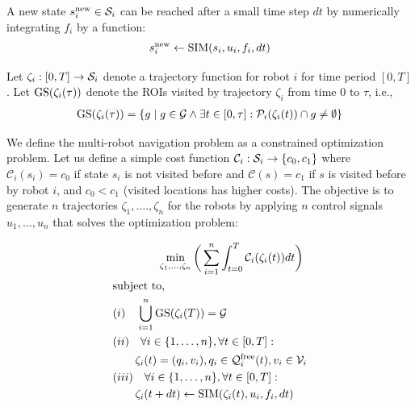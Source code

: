 \documentclass{article}
\begin{document}
A new state $s_i^{\operatorname{new}} \in \mathcal{S}_i$ can be reached after a small time step $dt$ by numerically integrating $f_i$ by a function:
\begin{equation}
    s_i^{\operatorname{new}} \gets \operatorname{SIM}(s_i, u_i, f_i, dt)
\end{equation}

Let $\zeta_i: [0,T] \to \mathcal{S}_i$ denote a trajectory function for robot $i$ for time period $[0,T]$. Let $\operatorname{GS}(\zeta_i(\tau))$ denote the ROIs visited by trajectory $\zeta_i$ from time $0$ to $\tau$, i.e.,
\begin{equation}
\begin{split}
\operatorname{GS}(\zeta_i(\tau)) = \{ g \mid g \in \mathcal{G} \land \exists t \in [0,\tau]: \mathcal{P}_i(\zeta_i(t)) \cap g \neq \emptyset \}
\end{split}
\end{equation}

We define the multi-robot navigation problem as a constrained optimization problem. Let us define a simple cost function $\mathcal{C}_i: \mathcal{S}_i \to \{ c_0, c_1 \}$ where $\mathcal{C}_i(s_i) = c_0$ if state $s_i$ is not visited before and $\mathcal{C}(s) = c_1$ if $s$ is visited before by robot $i$, and $c_0 < c_1$ (visited locations has higher costs). The objective is to generate $n$ trajectories $\zeta_1,\ldots.,\zeta_n$ for the robots by applying $n$ control signals $u_1,\ldots,u_n$ that solves the optimization problem:

\begin{align}
& \qquad \qquad \min_{\zeta_1, \ldots, \zeta_n} \bigg( \sum_{i=1}^{n} \int_{t=0}^{T} \mathcal{C}_i (\zeta_i(t))dt \bigg)   \label{eq:opt} \\
& \textrm{subject to, }    \nonumber \\
& (i) \quad \bigcup_{i=1}^n \operatorname{GS}(\zeta_i(T)) = \mathcal{G}  \label{eq:const1}\\
& (ii) \quad \forall i \in \{1,\ldots,n\}, \forall t \in [0,T]: \nonumber \\
& \qquad \zeta_i(t) = (q_i, v_i), q_i \in \mathcal{Q}_i^{\mathrm{free}}(t), v_i \in \mathcal{V}_i \label{eq:const2}\\
& (iii) \quad \forall i \in \{1,\ldots,n\}, \forall t \in [0,T]: \nonumber \\
& \qquad \zeta_i(t+dt) \gets \operatorname{SIM}( \zeta_i(t), u_i, f_i, dt) \label{eq:const3}
\end{align}
\end{document}
